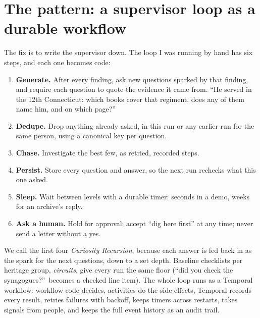 \documentclass[11pt]{article}
\begin{document}
\section*{The pattern: a supervisor loop as a durable workflow}
The fix is to write the supervisor down. The loop I was running by hand has six steps, and each one becomes code:
\begin{enumerate}
\item \textbf{Generate.} After every finding, ask new questions sparked by that finding, and require each question to quote the evidence it came from. ``He served in the 12th Connecticut: which books cover that regiment, does any of them name him, and on which page?''
\item \textbf{Dedupe.} Drop anything already asked, in this run or any earlier run for the same person, using a canonical key per question.
\item \textbf{Chase.} Investigate the best few, as retried, recorded steps.
\item \textbf{Persist.} Store every question and answer, so the next run rechecks what this one asked.
\item \textbf{Sleep.} Wait between levels with a durable timer: seconds in a demo, weeks for an archive's reply.
\item \textbf{Ask a human.} Hold for approval; accept ``dig here first'' at any time; never send a letter without a yes.
\end{enumerate}
We call the first four \emph{Curiosity Recursion}, because each answer is fed back in as the spark for the next questions, down to a set depth. Baseline checklists per heritage group, \emph{circuits}, give every run the same floor (``did you check the synagogues?''\ becomes a checked line item). The whole loop runs as a Temporal workflow: workflow code decides, activities do the side effects, Temporal records every result, retries failures with backoff, keeps timers across restarts, takes signals from people, and keeps the full event history as an audit trail.
\end{document}
